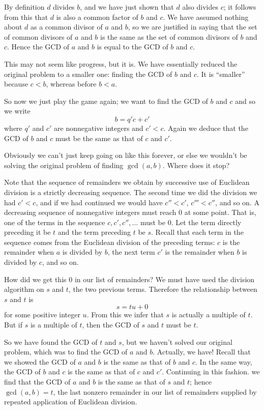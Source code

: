 \documentclass[a4paper,10pt]{article}
\begin{document}
By definition $d$ divides $b$, and we have just shown that $d$ also divides $c$; it follows
from this that $d$ is also a common factor of $b$ and $c$. We have assumed nothing about $d$
as a common divisor of $a$ and $b$, so we are justified in saying that the set of common
divisors of $a$ and $b$ is the same as the set of common divisors of $b$ and $c$. Hence the
GCD of $a$ and $b$ is equal to the GCD of $b$ and $c$.

This may not seem like progress, but it is. We have essentially reduced the original
problem to a smaller one: finding the GCD of $b$ and $c$. It is ``smaller'' because $c<b$,
whereas before $b<a$.

So now we just play the game again; we want to find the GCD of $b$ and $c$ and so we write
\[b=q'c+c'\]
where $q'$ and $c'$ are nonnegative integers and $c'<c$. Again we deduce that the GCD of $b$
and $c$ must be the same as that of $c$ and $c'$.

Obviously  we can't just keep going on like this forever, or else we wouldn't be solving
the original problem of finding $\gcd(a,b)$. Where does it stop?

Note that the sequence of remainders we obtain by successive use of Euclidean division is a strictly decreasing sequence.
The second time we did the division we had $c'<c$, and if we had continued we would have $c''<c'$, $c'''<c''$, and so on.
A decreasing sequence of nonnegative integers must reach $0$ at some point. That is, one of the terms in the sequence
$c,c',c'',\ldots$ must be $0$. Let the term directly preceding it be $t$ and the term preceding $t$ be $s$. Recall
that each term in the sequence comes from the Euclidean division of the preceding terms: $c$ is the remainder
when $a$ is divided by $b$, the next term $c'$ is the remainder when $b$ is divided by $c$, and so on.

How did we get this $0$ in our list of remainders? We must have used the division algorithm on $s$ and $t$,
the two previous terms. Therefore the relationship between $s$ and $t$ is
\[s=tu+0\]
for some positive integer $u$. From this we infer that $s$ is actually a multiple of $t$. But if $s$ is a multiple
of $t$, then the GCD of $s$ and $t$ must be $t$.

So we have found the GCD of $t$ and $s$, but we haven't solved our original problem, which was to
find the GCD of $a$ and $b$. Actually, we have! Recall that we showed the GCD of $a$ and $b$ is the same
as that of $b$ and $c$. In the same way, the GCD of $b$ and $c$ is the same as that of $c$ and $c'$. 
Continuing in this fashion. we find that the GCD of $a$ and $b$ is the same as that of $s$ and $t$; hence
$\gcd(a,b)=t$, the last nonzero remainder in our list of remainders supplied by repeated application of Euclidean division.
\end{document}
